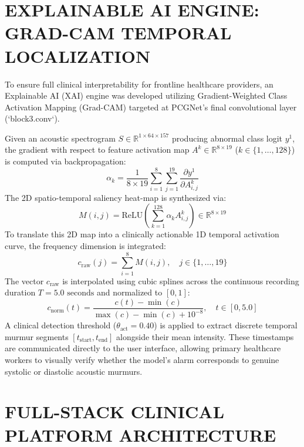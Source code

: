 \documentclass[12pt,a4paper]{amritareport}
\begin{document}
\section{EXPLAINABLE AI ENGINE: GRAD-CAM TEMPORAL LOCALIZATION}

To ensure full clinical interpretability for frontline healthcare providers, an Explainable AI (XAI) engine was developed utilizing Gradient-Weighted Class Activation Mapping (Grad-CAM) \cite{selvaraju2017grad} targeted at PCGNet's final convolutional layer (`block3.conv`).

Given an acoustic spectrogram $S \in \mathbb{R}^{1 \times 64 \times 157}$ producing abnormal class logit $y^1$, the gradient with respect to feature activation map $A^k \in \mathbb{R}^{8 \times 19}$ ($k \in \{1, \dots, 128\}$) is computed via backpropagation:
\begin{equation}
	\alpha_k = \frac{1}{8 \times 19} \sum_{i=1}^{8} \sum_{j=1}^{19} \frac{\partial y^1}{\partial A_{i, j}^k}
\end{equation}
The 2D spatio-temporal saliency heat-map is synthesized via:
\begin{equation}
	M(i, j) = \text{ReLU}\left(\sum_{k=1}^{128} \alpha_k A_{i, j}^k\right) \in \mathbb{R}^{8 \times 19}
\end{equation}
To translate this 2D map into a clinically actionable 1D temporal activation curve, the frequency dimension is integrated:
\begin{equation}
	c_{\text{raw}}(j) = \sum_{i=1}^{8} M(i, j), \quad j \in \{1, \dots, 19\}
\end{equation}
The vector $c_{\text{raw}}$ is interpolated using cubic splines across the continuous recording duration $T = 5.0\text{ seconds}$ and normalized to $[0, 1]$:
\begin{equation}
	c_{\text{norm}}(t) = \frac{c(t) - \min(c)}{\max(c) - \min(c) + 10^{-8}}, \quad t \in [0, 5.0]
\end{equation}
A clinical detection threshold ($\theta_{\text{act}} = 0.40$) is applied to extract discrete temporal murmur segments $[t_{\text{start}}, t_{\text{end}}]$ alongside their mean intensity. These timestamps are communicated directly to the user interface, allowing primary healthcare workers to visually verify whether the model's alarm corresponds to genuine systolic or diastolic acoustic murmurs.


\section{FULL-STACK CLINICAL PLATFORM ARCHITECTURE}
\end{document}
